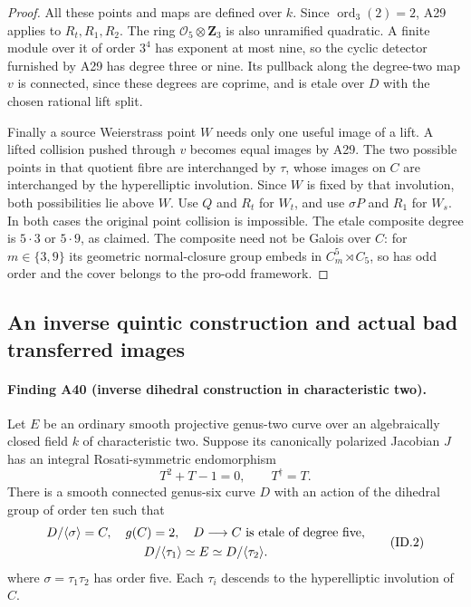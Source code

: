 \documentclass[11pt,a4paper]{article}
\begin{document}
\begin{proof}
All these points and maps are defined over $k$. Since
$\operatorname{ord}_3(2)=2$, A29 applies to $R_t,R_1,R_2$.
The ring $\mathcal O_5\otimes\mathbf Z_3$ is also unramified
quadratic. A finite module over it of order $3^4$ has exponent
at most nine, so the cyclic detector furnished by A29 has
degree three or nine. Its pullback along the degree-two map
$v$ is connected, since these degrees are coprime, and is
etale over $D$ with the chosen rational lift split.

Finally a source Weierstrass point $W$ needs only one useful
image of a lift. A lifted collision pushed through $v$
becomes equal images by A29. The two possible points in that
quotient fibre are interchanged by $\tau$, whose images on
$C$ are interchanged by the hyperelliptic involution. Since
$W$ is fixed by that involution, both possibilities lie above
$W$. Use $Q$ and $R_t$ for $W_t$, and use $\sigma P$ and
$R_1$ for $W_s$. In both cases the original point collision
is impossible. The etale composite degree is $5\cdot3$ or
$5\cdot9$, as claimed. The composite need not be Galois
over $C$: for $m\in\{3,9\}$ its geometric normal-closure
group embeds in $C_m^5\rtimes C_5$, so has odd order and
the cover belongs to the pro-odd framework.
\end{proof}


\subsection{An inverse quintic construction and actual bad transferred images}

\paragraph{Finding A40 (inverse dihedral construction in characteristic two).}
Let $E$ be an ordinary smooth projective genus-two curve over an
algebraically closed field $k$ of characteristic two. Suppose its
canonically polarized Jacobian $J$ has an integral Rosati-symmetric
endomorphism
\[
                    T^2+T-1=0,\qquad T^\dagger=T.
 \tag{ID.1}
\]
There is a smooth connected genus-six curve $D$ with an action of
the dihedral group of order ten such that
\[
 \begin{gathered}
 D/\langle\sigma\rangle=C,\quad g(C)=2,\quad
 D\longrightarrow C\ \hbox{is etale of degree five},\\
 D/\langle\tau_1\rangle\simeq E\simeq D/\langle\tau_2\rangle.
 \end{gathered}
 \tag{ID.2}
\]
where $\sigma=\tau_1\tau_2$ has order five. Each $\tau_i$
descends to the hyperelliptic involution of $C$.
\end{document}
